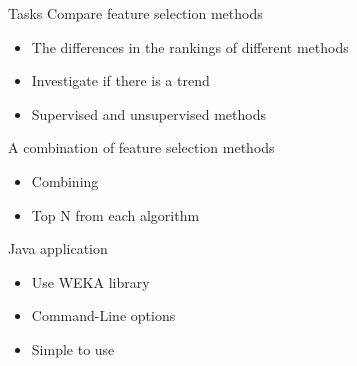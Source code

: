 \begin{frame}{Tasks}
\bs
\bi
\mi Compare feature selection methods
\begin{itemize}
  \item The differences in the rankings of different methods
  \item Investigate if there is a trend
  \item Supervised and unsupervised methods
\end{itemize}
\mi A combination of feature selection methods
\begin{itemize}
  \item Combining
  \item Top N from each algorithm
\end{itemize}
\mi Java application
\begin{itemize}
  \item Use WEKA library
  \item Command-Line options
  \item Simple to use
\end{itemize}
\ei

\end{frame}
